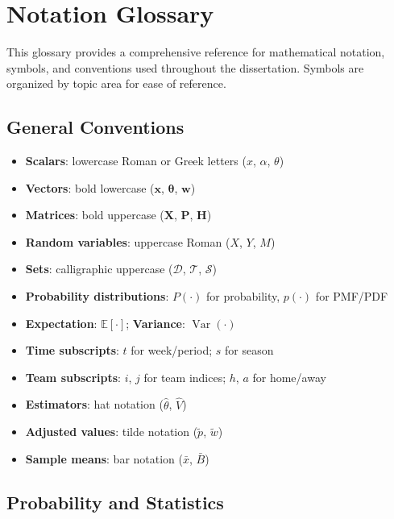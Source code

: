 \chapter{Notation Glossary} \label{app:notation}

This glossary provides a comprehensive reference for mathematical notation, symbols, and conventions used throughout the dissertation. Symbols are organized by topic area for ease of reference.

\section*{General Conventions}

\begin{itemize}[nosep]
  \item \textbf{Scalars}: lowercase Roman or Greek letters ($x$, $\alpha$, $\theta$)
  \item \textbf{Vectors}: bold lowercase ($\mathbf{x}$, $\boldsymbol{\theta}$, $\mathbf{w}$)
  \item \textbf{Matrices}: bold uppercase ($\mathbf{X}$, $\mathbf{P}$, $\mathbf{H}$)
  \item \textbf{Random variables}: uppercase Roman ($X$, $Y$, $M$)
  \item \textbf{Sets}: calligraphic uppercase ($\mathcal{D}$, $\mathcal{T}$, $\mathcal{S}$)
  \item \textbf{Probability distributions}: $P(\cdot)$ for probability, $p(\cdot)$ for PMF/PDF
  \item \textbf{Expectation}: $\mathbb{E}[\cdot]$; \textbf{Variance}: $\operatorname{Var}(\cdot)$
  \item \textbf{Time subscripts}: $t$ for week/period; $s$ for season
  \item \textbf{Team subscripts}: $i$, $j$ for team indices; $h$, $a$ for home/away
  \item \textbf{Estimators}: hat notation ($\hat{\theta}$, $\hat{V}$)
  \item \textbf{Adjusted values}: tilde notation ($\tilde{p}$, $\tilde{w}$)
  \item \textbf{Sample means}: bar notation ($\bar{x}$, $\bar{B}$)
\end{itemize}

\section*{Probability and Statistics}

